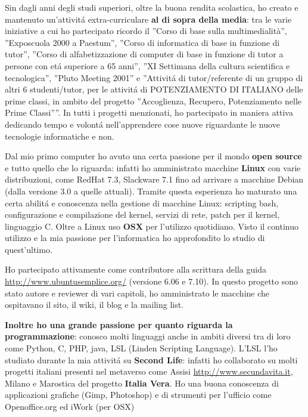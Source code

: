 \documentclass[totpages,helvetica,openbib,italian]{europecv}
\begin{document}
\begin{europecv}
{Sin dagli anni degli studi superiori, oltre la buona rendita scolastica, ho creato e mantenuto un'attivit\'a extra-curriculare \textbf{al di sopra della media}: tra le varie iniziative a cui ho partecipato ricordo il ''Corso di base sulla multimedialità'', ''Exposcuola 2000 a Paestum'', ''Corso di informatica di base in funzione di tutor'', ''Corso di alfabetizzazione di computer di base in funzione di tutor a persone con et\'a superiore a 65 anni'', ''XI Settimana della cultura scientifica e tecnologica'', ''Pluto Meeting 2001'' e ''Attivit\'a di tutor/referente di un gruppo di altri 6 studenti/tutor, per le attivit\'a di POTENZIAMENTO DI ITALIANO delle prime classi, in ambito del progetto ''Accoglienza, Recupero, Potenziamento nelle Prime Classi''''. In tutti i progetti menzionati, ho partecipato in maniera attiva dedicando tempo e volont\'a nell'apprendere cose nuove riguardante le nuove tecnologie informatiche e non.

Dal mio primo computer ho avuto una certa passione per il mondo \textbf{open source} e tutto quello che lo riguarda: infatti ho amministrato macchine \textbf{Linux} con varie distribuzioni, come RedHat 7.3, Slackware 7.1 fino ad arrivare a macchine Debian (dalla versione 3.0 a quelle attuali). Tramite questa esperienza ho maturato una certa abilit\'a e conoscenza nella gestione di macchine Linux: scripting bash, configurazione e compilazione del kernel, servizi di rete, patch per il kernel, linguaggio C. Oltre a Linux uso \textbf{OSX} per l'utilizzo quotidiano. Visto il continuo utilizzo e la mia passione per l'informatica ho approfondito lo studio di quest'ultimo.

Ho partecipato attivamente come contributore alla scrittura della guida \url{http://www.ubuntusemplice.org/} (versione 6.06 e 7.10). In questo progetto sono stato autore e reviewer di vari capitoli, ho amministrato le macchine che ospitavano il sito, il wiki, il blog e la mailing list.

\textbf{Inoltre ho una grande passione per quanto riguarda la programmazione}: conosco molti linguaggi anche in ambiti diversi tra di loro come Python, C, PHP, java, LSL (Linden Scripting Language). L'LSL l'ho studiato durante la mia attivit\'a su \textbf{Second Life}: infatti ho collaborato su molti progetti italiani presenti nel metaverso come Assisi \url{http://www.secundavita.it}, Milano e Marostica del progetto \textbf{Italia Vera}.
Ho una buona conoscenza di applicazioni grafiche (Gimp, Photoshop) e di strumenti per l'ufficio come Openoffice.org ed iWork (per OSX)}


\end{europecv}
\end{document}
